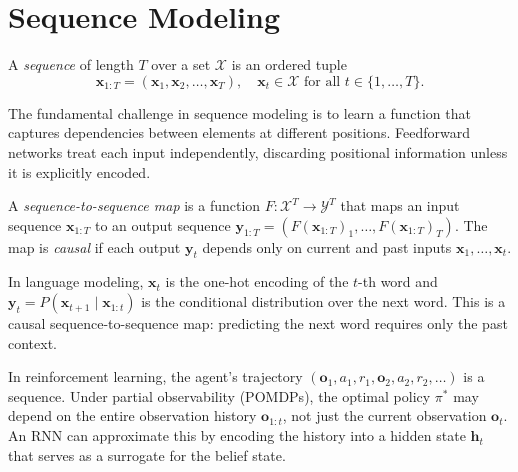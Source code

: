 \documentclass[11pt,a4paper]{article}
\begin{document}
\section{Sequence Modeling}
\label{sec:sequences}

\begin{definition}[Sequence]
\label{def:sequence}
A \emph{sequence} of length $T$ over a set $\mathcal{X}$ is an
ordered tuple
\[
  \mathbf{x}_{1:T} = (\mathbf{x}_1, \mathbf{x}_2, \ldots,
    \mathbf{x}_T), \quad
  \mathbf{x}_t \in \mathcal{X} \text{ for all } t \in \{1,\ldots,T\}.
\]
\end{definition}

The fundamental challenge in sequence modeling is to learn a function
that captures dependencies between elements at different positions.
Feedforward networks treat each input independently, discarding
positional information unless it is explicitly encoded.

\begin{definition}
\label{def:seq2seq-map}
A \emph{sequence-to-sequence map} is a function
$F : \mathcal{X}^T \to \mathcal{Y}^T$ that maps an input sequence
$\mathbf{x}_{1:T}$ to an output sequence
$\mathbf{y}_{1:T} = (F(\mathbf{x}_{1:T})_1, \ldots,
F(\mathbf{x}_{1:T})_T)$.  The map is \emph{causal} if each output
$\mathbf{y}_t$ depends only on current and past inputs
$\mathbf{x}_1, \ldots, \mathbf{x}_t$.
\end{definition}

\begin{example}
\label{ex:language-model}
In language modeling, $\mathbf{x}_t$ is the one-hot encoding of the
$t$-th word and $\mathbf{y}_t = P(\mathbf{x}_{t+1} \mid
\mathbf{x}_{1:t})$ is the conditional distribution over the next word.
This is a causal sequence-to-sequence map: predicting the next word
requires only the past context.
\end{example}

\begin{rlconnection}[title={Sequences in RL}]
In reinforcement learning, the agent's trajectory
$(\mathbf{o}_1, a_1, r_1, \mathbf{o}_2, a_2, r_2, \ldots)$ is a
sequence.  Under partial observability (POMDPs), the optimal policy
$\pi^*$ may depend on the entire observation history
$\mathbf{o}_{1:t}$, not just the current observation $\mathbf{o}_t$.
An RNN can approximate this by encoding the history into a hidden
state $\mathbf{h}_t$ that serves as a surrogate for the belief state.
\end{rlconnection}
\end{document}
